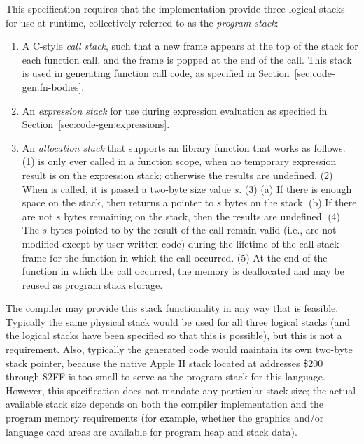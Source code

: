 \documentclass[10pt]{article}
\begin{document}
This specification requires that the implementation provide three
logical stacks for use at runtime, collectively referred to as the
\emph{program stack}:
%
\begin{enumerate}
%
\item A C-style \emph{call stack}, such that a new frame appears at
  the top of the stack for each function call, and the frame is popped
  at the end of the call.  This stack is used in generating function
  call code, as specified in Section~\ref{sec:code-gen:fn-bodies}.
%
\item An \emph{expression stack} for use during expression evaluation
  as specified in Section~\ref{sec:code-gen:expressions}.
%
\item An \emph{allocation stack} that supports an 
  library function that works as follows.  (1)  is only
  ever called in a function scope, when no temporary expression result
  is on the expression stack; otherwise the results are undefined.
  (2) When  is called, it is passed a two-byte size
  value $s$.  (3) (a) If there is enough space on the stack, then
   returns a pointer to $s$ bytes on the stack. (b) If
  there are not $s$ bytes remaining on the stack, then the results are
  undefined. (4) The $s$ bytes pointed to by the result of the
   call remain valid (i.e., are not modified except by
  user-written code) during the lifetime of the call stack frame for
  the function in which the  call occurred.  (5) At the
  end of the function in which the  call occurred, the
  memory is deallocated and may be reused as program stack storage.
%
\end{enumerate}

The compiler may provide this stack functionality in any way that is
feasible.  Typically the same physical stack would be used for all
three logical stacks (and the logical stacks have been specified so
that this is possible), but this is not a requirement.  Also,
typically the generated code would maintain its own two-byte stack
pointer, because the native Apple II stack located at addresses \$200
through \$2FF is too small to serve as the program stack for this
language.  However, this specification does not mandate any particular
stack size; the actual available stack size depends on both the
compiler implementation and the program memory requirements (for
example, whether the graphics and/or language card areas are available
for program heap and stack data).
\end{document}
